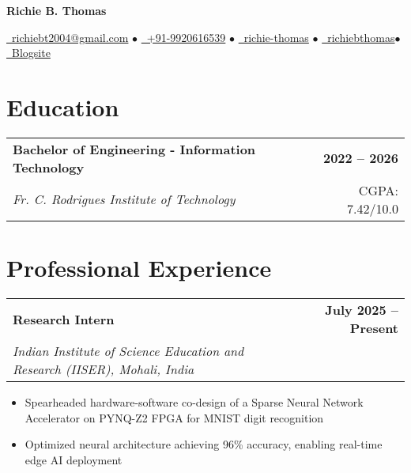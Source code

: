 \documentclass[10pt,a4paper]{article}
\makeatletter
\newcommand{\resumeItem}[1]{\item\small{#1}}
\newcommand{\resumeSubheading}[4]{
  \vspace{-1pt}
  \begin{tabular*}{\textwidth}[t]{l@{\extracolsep{\fill}}r}
    \textbf{#1} & \textcolor{light}{\small\textbf{#2}} \\
    \textit{\small#3} & \textcolor{light}{\small#4} \\
  \end{tabular*}\vspace{-5pt}
}
\makeatother
\begin{document}
\begin{center}
    {\LARGE\bfseries\color{primary} Richie B. Thomas}
    
    \vspace{0.3em}
    
    \href{mailto:richiebt2004@gmail.com}{\faEnvelope\ richiebt2004@gmail.com} $\bullet$
    \href{tel:+919920616539}{\faMobile\ +91-9920616539} $\bullet$
    \href{https://www.linkedin.com/in/richie-thomas/}{\faLinkedin\ richie-thomas} $\bullet$
    \href{https://github.com/richiebthomas}{\faGithub\ richiebthomas}$\bullet$
    \href{https://richiebthomas.github.io/blog}{\faGlobe\ Blogsite}
\end{center}

\vspace{0.2em}

\section{Education}

\resumeSubheading
{Bachelor of Engineering - Information Technology}{2022 -- 2026}
{Fr. C. Rodrigues Institute of Technology}{CGPA: 7.42/10.0}

\vspace{0.1em}

\section{Professional Experience}

\resumeSubheading
{Research Intern}{July 2025 -- Present}
{Indian Institute of Science Education and Research (IISER), Mohali, India}{}
\begin{itemize}
    \resumeItem{Spearheaded hardware-software co-design of a Sparse Neural Network Accelerator on PYNQ-Z2 FPGA for MNIST digit recognition}
    \resumeItem{Optimized neural architecture achieving 96\% accuracy, enabling real-time edge AI deployment}
\end{itemize}
\end{document}
